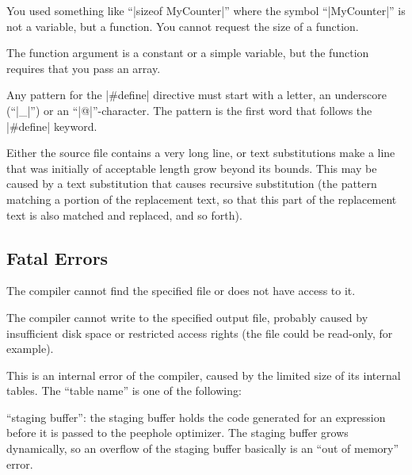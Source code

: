 {{ 
        You used something like ``|sizeof MyCounter|'' where the symbol ``|MyCounter|''
        is not a variable, but a function. You cannot request the size of a
        function.

 
        The function argument is a constant or a simple variable, but the
        function requires that you pass an array.

 
        Any pattern for the |#define| directive must start with a letter, an underscore
        (``|_|'') or an ``|@|''-character. The pattern is the first word that
        follows the |#define| keyword.

 
        Either the source file contains a very long line, or text substitutions
        make a line that was initially of acceptable length grow beyond its bounds.
        This may be caused by a text substitution that causes recursive substitution
        (the pattern matching a portion of the replacement text, so that this part
        of the replacement text is also matched and replaced, and so forth).

\endlist


\subsection{Fatal Errors}

\beginlist{40pt}
 
        The compiler cannot find the specified file or does not have access to
        it.

 
        The compiler cannot write to the specified output file, probably
        caused by insufficient disk space or restricted access rights (the
        file could be read-only, for example).

 
        This is an internal error of the compiler, caused by the limited size
        of its internal tables. The ``table name'' is one of the following:

        ``staging buffer'': the staging buffer holds the code generated for an
        expression before it is passed to the peephole optimizer. The staging
        buffer grows dynamically, so an overflow of the staging buffer
        basically is an ``out of memory'' error.

}}
